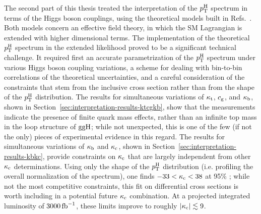 The second part of this thesis treated the interpretation of the $p_\mathrm{T}^\mathrm{H}$ spectrum in terms of the Higgs boson couplings, using the theoretical models built in Refs.~\cite{Grazzini:2017szg,Grazzini:2016paz,Bishara:2016jga}.
% 
Both models concern an effective field theory, in which the SM Lagrangian is extended with higher dimensional terms.
% 
The implementation of the theoretical $p_\mathrm{T}^\mathrm{H}$ spectrum in the extended likelihood proved to be a significant technical challenge.
% 
It required first an accurate parametrization of the $p_\mathrm{T}^\mathrm{H}$ spectrum under various Higgs boson coupling variations, a scheme for dealing with bin-to-bin correlations of the theoretical uncertainties, and a careful consideration of the constraints that stem from the inclusive cross section rather than from the shape of the $p_\mathrm{T}^\mathrm{H}$ distribution.
% 
The results for simultaneous variations of $\kappa_{\mathrm{t}}$, $c_\mathrm{g}$, and $\kappa_{\mathrm{b}}$, shown in Section~\ref{sec:interpretation-results-ktcgkb}, show that the measurements indicate the presence of finite quark mass effects, rather than an infinite top mass in the loop structure of $\mathrm{g}\mathrm{g}\mathrm{H}$; while not unexpected, this is one of the few (if not the only) pieces of experimental evidence in this regard.
% 
The results for simultaneous variations of $\kappa_{\mathrm{b}}$ and $\kappa_{\mathrm{c}}$, shown in Section~\ref{sec:interpretation-results-kbkc}, provide constraints on $\kappa_{\mathrm{c}}$ that are largely independent from other $\kappa_{\mathrm{c}}$ determinations.
% 
Using only the shape of the $p_\mathrm{T}^\mathrm{H}$ distribution (i.e. profiling the overall normalization of the spectrum), one finds $-33 < \kappa_{\mathrm{c}} < 38$ at 95\% \CL; while not the most competitive constraints, this fit on differential cross sections is worth including in a potential future $\kappa_{\mathrm{c}}$ combination.
% 
At a projected integrated luminosity of $3000\,\text{fb}^{-1}$, these limits improve to roughly $\left| \kappa_{\mathrm{c}} \right |\lesssim9$.


